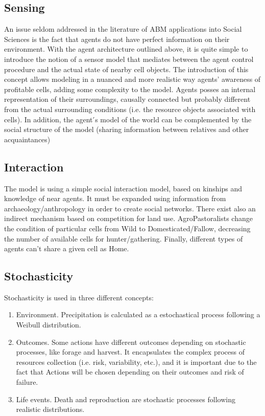 \begin{enumerate}
\begin{enumerate}
\begin{enumeration}
\begin{enumerate}
\begin{enumerate}
\begin{enumerate}
\subsection{Sensing}
An issue seldom addressed in the literature of ABM applications into Social Sciences is the fact that
agents do not have perfect information on their environment.
With the agent architecture outlined above, it is quite simple to introduce the notion of a sensor model
that mediates between the agent control procedure and the actual state of nearby cell objects. The
introduction of this concept allows modeling in a nuanced and more realistic way agents’ awareness of
profitable cells, adding some complexity to the model. Agents posses an internal representation of
their surroundings, causally connected but probably different from the actual surrounding conditions
(i.e. the resource objects associated with cells). In addition, the agent ́s model of the world can be
complemented by the social structure of the model (sharing information between relatives and other
acquaintances)

\subsection{Interaction}
The model is using a simple social interaction model, based on kinships and knowledge of near
agents. It must be expanded using information from archaeology/anthropology in order to create social
networks.
There exist also an indirect mechanism based on competition for land use. AgroPastoralists change
the condition of particular cells from Wild to Domesticated/Fallow, decreasing the number of available
cells for hunter/gathering. Finally, different types of agents can't share a given cell as Home.

\subsection{Stochasticity}
Stochasticity is used in three different concepts:
\begin{enumerate}
\item Environment. Precipitation is calculated as a estochastical process following a Weibull
distribution.
\item Outcomes. Some actions have different outcomes depending on stochastic processes,
like forage and harvest. It encapsulates the complex process of resources collection (i.e.
risk, variability, etc.), and it is important due to the fact that Actions will be chosen
depending on their outcomes and risk of failure.
\item Life events. Death and reproduction are stochastic processes following realistic
distributions.


\end{enumerate}
\end{enumerate}
\end{enumerate}
\end{enumerate}
\end{enumeration}
\end{enumerate}
\end{enumerate}
